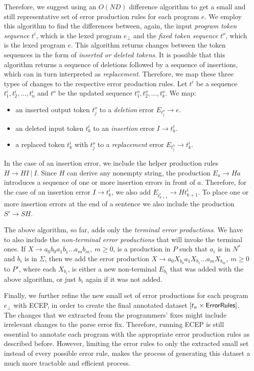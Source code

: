 Therefore, we suggest using an $O(ND)$ difference algorithm to get a small and
still representative set of error production rules for each program $e$. We
employ this algorithm to find the differences between, again, the input
\emph{program token sequence} $t^i$, which is the lexed program $e_{\bot}$ and
the \emph{fixed token sequence} $t^o$, which is the lexed program $e$. This
algorithm returns changes between the token sequences in the form of
\emph{inserted or deleted tokens}. It is possible that this algorithm returns a
sequence of deletions followed by a sequence of insertions, which can in turn
interpreted as \emph{replacement}. Therefore, we map these three types of
changes to the respective error production rules. Let $t^i$ be a sequence
$t^i_1, t^i_2, \dots, t^i_n$ and $t^o$ be the updated sequence $t^o_1, t^o_2,
\dots, t^o_k$. We map:
\begin{itemize}
    \item an inserted output token $t^o_j$ to a \emph{deletion} error $E_{t^o_j}
    \rightarrow e$.
    \item an deleted input token $t^i_k$ to an \emph{insertion} error $I
    \rightarrow t^i_k$.
    \item a replaced token $t^i_k$ with $t^o_j$ to a \emph{replacement} error
    $E_{t^o_j} \rightarrow t^i_k$.
\end{itemize}

In the case of an insertion error, we include the helper production rules $H
\rightarrow HI\ \vert\ I$. Since $H$ can derive any nonempty string, the
production $E_a \rightarrow Ha$ introduces a sequence of one or more insertion
errors in front of $a$. Therefore, for the case of an insertion error $I
\rightarrow t^i_k$, we also add $E_{t^i_{k+1}} \rightarrow Ht^i_{k+1}$. To place
one or more insertion errors at the end of a sentence we also include the
production $S' \rightarrow SH$.

The above algorithm, so far, adds only the \emph{terminal error productions}. We
have to also include the \emph{non-terminal error productions} that will invoke
the terminal ones. If $X \rightarrow a_0b_0a_1b_1 \dots a_mb_m,\ m \geq 0$, is a
production in $P$ such that $a_i$ is in $N^*$ and $b_i$ is in $\Sigma$, then we
add the error production $X \rightarrow a_0X_{b_0}a_1X_{b_1} \dots a_mX_{b_m},\
m \geq 0$ to $P'$, where each $X_{b_i}$, is either a new non-terminal $E_{b_i}$
that was added with the above algorithm, or just $b_i$ again if it was not
added.

Finally, we further refine the new small set of error productions for each
program $e_{\bot}$ with ECEP, in order to create the final annotated dataset
$[t_a \times \mathsf{ErrorRules}]$. The changes that we extracted from the
programmers' fixes might include irrelevant changes to the parse error fix.
Therefore, running ECEP is still essential to annotate each program with the
appropriate error production rules as described before. However, limiting the
error rules to only the extracted small set instead of every possible error
rule, makes the process of generating this dataset a much more tractable and
efficient process.


